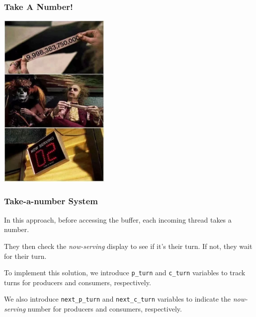 \begin{frame}
	\frametitle{Take A Number!}

	\begin{center}
		\includegraphics[width=0.4\textwidth]{images/now_serving}
	\end{center}
\end{frame}

\begin{frame}
	\frametitle{Take-a-number System}
	In this approach, before accessing the buffer, each incoming thread takes a number.

	They then check the \emph{now-serving} display to see if it's their turn.
	If not, they wait for their turn.

	To implement this solution, we introduce \texttt{p\_turn} and \texttt{c\_turn} variables to track turns for producers and consumers, respectively.

	We also introduce \texttt{next\_p\_turn} and \texttt{next\_c\_turn} variables to indicate the \emph{now-serving} number for producers and consumers, respectively.

\end{frame}

